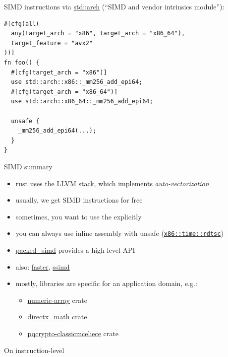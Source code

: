 \documentclass{beamer}
\begin{document}
\begin{frame}[fragile]{SIMD instructions}
  via \href{https://doc.rust-lang.org/1.29.0/std/arch/}{std::arch} (\enquote{SIMD and vendor intrinsics module}):

  \begin{verbatim}
#[cfg(all(
  any(target_arch = "x86", target_arch = "x86_64"),
  target_feature = "avx2"
))]
fn foo() {
  #[cfg(target_arch = "x86")]
  use std::arch::x86::_mm256_add_epi64;
  #[cfg(target_arch = "x86_64")]
  use std::arch::x86_64::_mm256_add_epi64;

  unsafe {
    _mm256_add_epi64(...);
  }
}
  \end{verbatim}
\end{frame}

\begin{frame}[fragile]{SIMD summary}
  \begin{itemize}
    \item rust uses the LLVM stack, which implements \emph{auto-vectorization}
    \item usually, we get SIMD instructions for free
    \item sometimes, you want to use the explicitly
    \item you can always use inline assembly with unsafe (\texttt{\href{https://docs.rs/x86/0.29.0/x86/time/fn.rdtsc.html}{x86::time::rdtsc}})
    \item \href{https://github.com/rust-lang/packed_simd}{packed\_simd} provides a high-level API
    \item also: \href{https://crates.io/crates/faster}{faster}, \href{https://crates.io/crates/ssimd}{ssimd}
    \item mostly, libraries are specific for an application domain, e.g.:
    \begin{itemize}
      \item \href{https://github.com/novacrazy/numeric-array}{numeric-array} crate
      \item \href{https://crates.io/crates/directx_math}{directx\_math} crate
      \item \href{https://crates.io/crates/pqcrypto-classicmceliece}{pqcrypto-classicmceliece} crate
    \end{itemize}
  \end{itemize}
\end{frame}

\begin{frame}[standout]
  On instruction-level
\end{frame}
\end{document}
